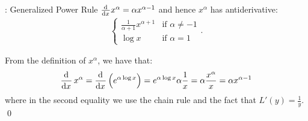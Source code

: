 \begin{ntheorem}{: Generalized Power Rule}{}
    $\od{}{x}x^\alpha = \alpha x^{\alpha -1}$ and hence $x^\alpha$ has antiderivative:
    \begin{align*}
        \begin{cases}
            \frac{1}{\alpha + 1}x^{\alpha + 1} & \text{if $\alpha \neq -1$}
            \\ \log x & \text{if $\alpha = 1$}
        \end{cases}.
    \end{align*}
\end{ntheorem}
\begin{nproof}
    From the definition of $x^\alpha$, we have that:
    \begin{align*}
        \dod{}{x}x^\alpha = \dod{}{x}\left(e^{\alpha \log x}\right) = e^{\alpha \log x} \alpha\frac{1}{x} = \alpha\frac{x^\alpha}{x} = \alpha x^{\alpha - 1}
    \end{align*}
    where in the second equality we use the chain rule and the fact that $L'(y) = \frac{1}{y}$. \qed
\end{nproof}


